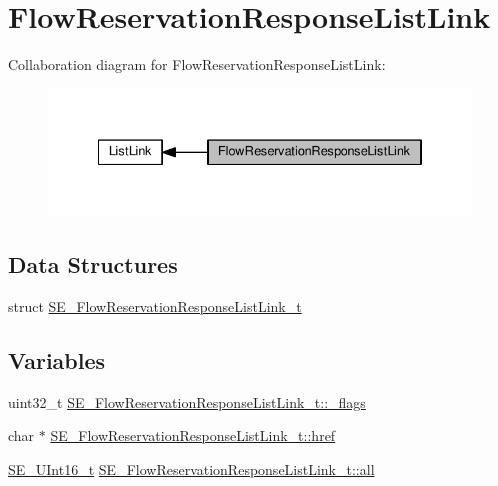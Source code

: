 \hypertarget{group__FlowReservationResponseListLink}{}\section{Flow\+Reservation\+Response\+List\+Link}
\label{group__FlowReservationResponseListLink}
Collaboration diagram for Flow\+Reservation\+Response\+List\+Link\+:\nopagebreak
\begin{figure}[H]
\begin{center}
\leavevmode
\includegraphics[width=334pt]{group__FlowReservationResponseListLink}
\end{center}
\end{figure}
\subsection*{Data Structures}
\begin{DoxyCompactItemize}
\item 
struct \hyperlink{structSE__FlowReservationResponseListLink__t}{S\+E\+\_\+\+Flow\+Reservation\+Response\+List\+Link\+\_\+t}
\end{DoxyCompactItemize}
\subsection*{Variables}
\begin{DoxyCompactItemize}
\item 
uint32\+\_\+t \hyperlink{group__FlowReservationResponseListLink_ga472e40613d38ed956c259f385ad4c968}{S\+E\+\_\+\+Flow\+Reservation\+Response\+List\+Link\+\_\+t\+::\+\_\+flags}
\item 
char $\ast$ \hyperlink{group__FlowReservationResponseListLink_ga5b80e4ee833995e4a00a6a74745ffd7d}{S\+E\+\_\+\+Flow\+Reservation\+Response\+List\+Link\+\_\+t\+::href}
\item 
\hyperlink{group__UInt16_gac68d541f189538bfd30cfaa712d20d29}{S\+E\+\_\+\+U\+Int16\+\_\+t} \hyperlink{group__FlowReservationResponseListLink_ga02d2763d5df8aaabc150972dee8b15f6}{S\+E\+\_\+\+Flow\+Reservation\+Response\+List\+Link\+\_\+t\+::all}
\end{DoxyCompactItemize}


